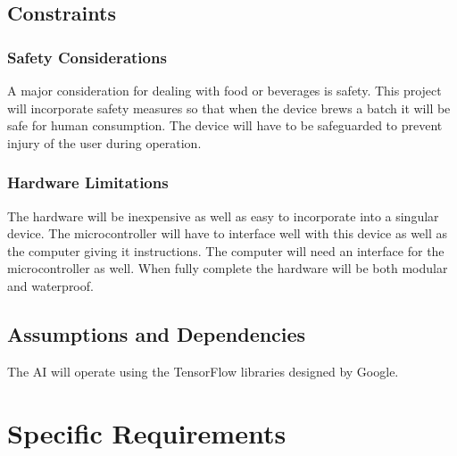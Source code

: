 \documentclass[draftclsnofoot,onecolumn,letterpaper,10pt]{article}
\begin{document}
\subsection{Constraints}
\subsubsection{Safety Considerations}
A major consideration for dealing with food or beverages is safety.
This project will incorporate safety measures so that when the device brews a batch it will be safe for human consumption.
The device will have to be safeguarded to prevent injury of the user during operation.
\subsubsection{Hardware Limitations}
The hardware will be inexpensive as well as easy to incorporate into a singular device.
The microcontroller will have to interface well with this device as well as the computer giving it instructions.
The computer will need an interface for the microcontroller as well.
When fully complete the hardware will be both modular and waterproof.

\subsection{Assumptions and Dependencies}
The AI will operate using the TensorFlow libraries designed by Google.

\section{Specific Requirements}
\end{document}
